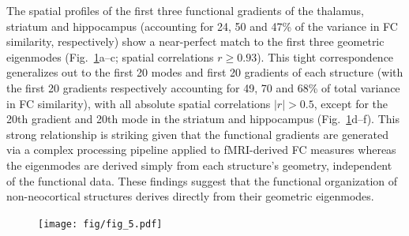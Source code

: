 \documentclass[sn-mathphys-num]{sn-jnl}%
\theoremstyle{thmstyleone}%
\theoremstyle{thmstyletwo}%
\theoremstyle{thmstylethree}%
\begin{document}
The spatial profiles of the first three functional gradients of the thalamus, striatum and hippocampus (accounting for 24, 50 and 47\% of the variance in FC similarity, respectively) show a near-perfect match to the first three geometric eigenmodes (Fig.~\ref{fig:5}a–c; spatial correlations $ r\geq0.93 $). 
This tight correspondence generalizes out to the first 20 modes and first 20 gradients of each structure (with the first 20 gradients respectively accounting for 49, 70 and 68\% of total variance in FC similarity), with all absolute spatial correlations $ |r| > 0.5 $, except for the 20th gradient and 20th mode in the striatum and hippocampus (Fig.~\ref{fig:5}d–f). 
This strong relationship is striking given that the functional gradients are generated via a complex processing pipeline applied to fMRI-derived FC measures whereas the eigenmodes are derived simply from each structure’s geometry, independent of the functional data. These findings suggest that the functional organization of non-neocortical structures derives directly from their geometric eigenmodes.


\begin{figure}[!htb]
	\centering
	\texttt{[image: fig/fig\_5.pdf]}
	\caption{
	} \label{fig:5}
\end{figure}
\end{document}
